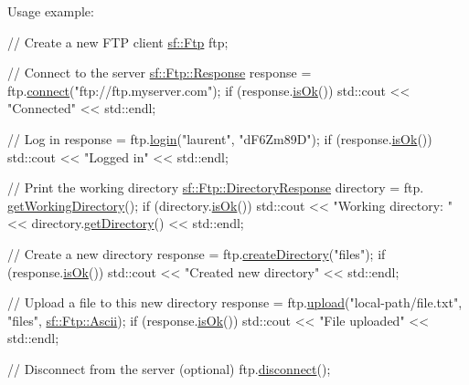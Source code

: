 Usage example\-: 
\begin{DoxyCode}
\textcolor{comment}{// Create a new FTP client}
\hyperlink{classsf_1_1_ftp}{sf::Ftp} ftp;

\textcolor{comment}{// Connect to the server}
\hyperlink{classsf_1_1_ftp_1_1_response}{sf::Ftp::Response} response = ftp.\hyperlink{classsf_1_1_ftp_af02fb3de3f450a50a27981961c69c860}{connect}(\textcolor{stringliteral}{"ftp://ftp.myserver.com"});
\textcolor{keywordflow}{if} (response.\hyperlink{classsf_1_1_ftp_1_1_response_a4dadbe0fe0a3ef2d571a017e1645e675}{isOk}())
    std::cout << \textcolor{stringliteral}{"Connected"} << std::endl;

\textcolor{comment}{// Log in}
response = ftp.\hyperlink{classsf_1_1_ftp_a686262bc377584cd50e52e1576aa3a9b}{login}(\textcolor{stringliteral}{"laurent"}, \textcolor{stringliteral}{"dF6Zm89D"});
\textcolor{keywordflow}{if} (response.\hyperlink{classsf_1_1_ftp_1_1_response_a4dadbe0fe0a3ef2d571a017e1645e675}{isOk}())
    std::cout << \textcolor{stringliteral}{"Logged in"} << std::endl;

\textcolor{comment}{// Print the working directory}
\hyperlink{classsf_1_1_ftp_1_1_directory_response}{sf::Ftp::DirectoryResponse} directory = ftp.
      \hyperlink{classsf_1_1_ftp_a79c654fcdd0c81e68c4fa29af3b45e0c}{getWorkingDirectory}();
\textcolor{keywordflow}{if} (directory.\hyperlink{classsf_1_1_ftp_1_1_response_a4dadbe0fe0a3ef2d571a017e1645e675}{isOk}())
    std::cout << \textcolor{stringliteral}{"Working directory: "} << directory.\hyperlink{classsf_1_1_ftp_1_1_directory_response_a500793778ad0ed223aa86ed8fbee28a3}{getDirectory}() << std::endl;

\textcolor{comment}{// Create a new directory}
response = ftp.\hyperlink{classsf_1_1_ftp_a247b84c4b25da37804218c2b748c4787}{createDirectory}(\textcolor{stringliteral}{"files"});
\textcolor{keywordflow}{if} (response.\hyperlink{classsf_1_1_ftp_1_1_response_a4dadbe0fe0a3ef2d571a017e1645e675}{isOk}())
    std::cout << \textcolor{stringliteral}{"Created new directory"} << std::endl;

\textcolor{comment}{// Upload a file to this new directory}
response = ftp.\hyperlink{classsf_1_1_ftp_a46d6e15cddd719288b5a08b685e11765}{upload}(\textcolor{stringliteral}{"local-path/file.txt"}, \textcolor{stringliteral}{"files"}, \hyperlink{classsf_1_1_ftp_a1cd6b89ad23253f6d97e6d4ca4d558cbac9e544a22dce8ef3177449cb235d15c2}{sf::Ftp::Ascii});
\textcolor{keywordflow}{if} (response.\hyperlink{classsf_1_1_ftp_1_1_response_a4dadbe0fe0a3ef2d571a017e1645e675}{isOk}())
    std::cout << \textcolor{stringliteral}{"File uploaded"} << std::endl;

\textcolor{comment}{// Disconnect from the server (optional)}
ftp.\hyperlink{classsf_1_1_ftp_acf7459926f3391cd06bf84337ed6a0f4}{disconnect}();
\end{DoxyCode}
 

